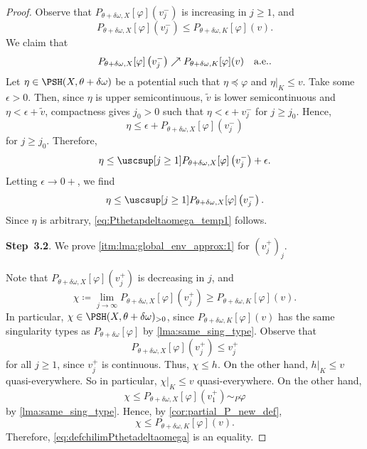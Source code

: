 \begin{proof}
Observe that $P_{\theta + \delta \omega,X}[\varphi](v^-_j)$ is increasing in $j\geq 1$, and
\[
P_{\theta + \delta \omega,X}[\varphi]\left(v^-_j\right)\leq P_{\theta + \delta \omega,K}[\varphi](v).
\]
We claim that
\begin{equation}\label{eq:Pthetapdeltaomega_temp1}
P_{\theta + \delta \omega,X}[\varphi]\left(v^-_j\right) \nearrow P_{\theta + \delta \omega,K}[\varphi](v)\quad \textup{a.e.}.
\end{equation}
Let $\eta\in \PSH(X,\theta+\delta\omega)$ be a potential such that $\eta\preceq \varphi$ and $\eta|_K\leq v$. Take some $\epsilon>0$. Then, since $\eta$ is upper semicontinuous, $\widetilde v$ is lower semicontinuous and $\eta < \epsilon+\widetilde v$, compactness gives $j_0>0$ such that $\eta < \epsilon+ v^-_j$ for $j \geq j_0$. Hence,
\[
\eta \leq \epsilon+P_{\theta + \delta \omega,X}[\varphi](v^-_j)
\]
for $j\geq j_0$.
Therefore,
\[
\eta\leq \uscsup[j\geq 1] P_{\theta + \delta \omega,X}[\varphi]\left(v^-_j\right)+\epsilon.
\]
Letting $\epsilon\to 0+$, we find
\[
\eta\leq \uscsup[j\geq 1] P_{\theta + \delta \omega,X}[\varphi]\left(v^-_j\right).
\]
Since $\eta$ is arbitrary, \eqref{eq:Pthetapdeltaomega_temp1} follows.

\textbf{Step~3.2}. We prove \ref{itm:lma:global_env_approx:1} for $(v^+_j)_j$.

Note that $P_{\theta + \delta \omega,X}[\varphi](v^+_j)$ is decreasing in $j$, and
\begin{equation}\label{eq:defchilimPthetadeltaomega}
\chi \coloneqq \lim_{j\to\infty} P_{\theta + \delta \omega,X}[\varphi]\left(v^+_j\right) \geq P_{\theta + \delta \omega,K}[\varphi](v).
\end{equation}
In particular, $\chi\in \PSH(X,\theta+\delta\omega)_{>0}$, since $P_{\theta + \delta \omega,K}[\varphi](v)$ has the same singularity types as $P_{\theta + \delta \omega}[\varphi]$ by \cref{lma:same_sing_type}.
Observe that
\[
P_{\theta + \delta \omega,X}[\varphi]\left(v_j^+\right)\leq v_j^+
\]
for all $j\geq 1$, since $v_j^+$ is continuous. Thus, $\chi\leq h$.
On the other hand, $h|_K\leq v$ quasi-everywhere. So in particular, $\chi|_{K}\leq v$ quasi-everywhere.
On the other hand,
\[
\chi\leq P_{\theta + \delta \omega,X}[\varphi]\left(v^+_1\right)\sim_P \varphi
\]
by \cref{lma:same_sing_type}. Hence, by \cref{cor:partial_P_new_def},
\[
\chi\leq P_{\theta + \delta \omega,K}[\varphi](v).
\]
Therefore, \eqref{eq:defchilimPthetadeltaomega} is an equality.
\end{proof}


